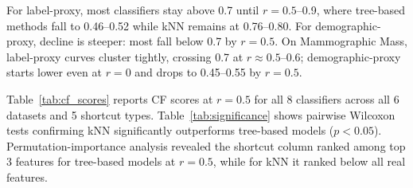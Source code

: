 \documentclass[conference]{IEEEtran}
\begin{document}
For label-proxy, most classifiers stay above 0.7 until $r=0.5$--0.9, where tree-based methods fall to 0.46--0.52 while kNN remains at 0.76--0.80. For demographic-proxy, decline is steeper: most fall below 0.7 by $r=0.5$. On Mammographic Mass, label-proxy curves cluster tightly, crossing 0.7 at $r\approx0.5$--0.6; demographic-proxy starts lower even at $r=0$ and drops to 0.45--0.55 by $r=0.5$.

Table~\ref{tab:cf_scores} reports CF scores at $r=0.5$ for all 8 classifiers across all 6 datasets and 5 shortcut types. Table~\ref{tab:significance} shows pairwise Wilcoxon tests confirming kNN significantly outperforms tree-based models ($p<0.05$). Permutation-importance analysis revealed the shortcut column ranked among top 3 features for tree-based models at $r=0.5$, while for kNN it ranked below all real features.
\end{document}
